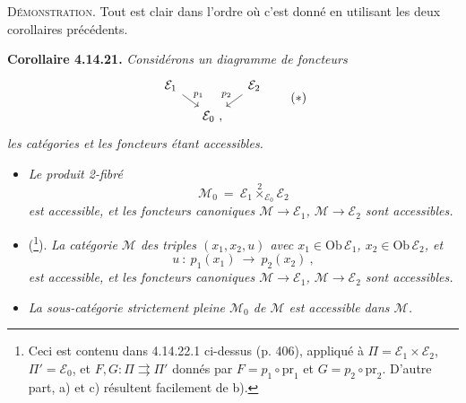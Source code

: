\documentclass[11pt]{article}
\newcommand{\msp}[1]{\marginpar{\footnotesize [#1]}}
\newcommand{\Ob}{\mathrm{Ob}\,}
\newcommand{\pr}{\mathrm{pr}}
\begin{document}
\textsc{Démonstration}. Tout est clair dans l’ordre où c’est donné en utilisant les deux corollaires précédents.

\textbf{Corollaire 4.14.21.} \textit{Considérons un diagramme de foncteurs}
\[
\begin{tikzcd}[column sep=small, row sep=small]
\mathcal{E}_1 \arrow[dr, "p_1"] & & \mathcal{E}_2 \arrow[dl, "p_2"'] \\
& \mathcal{E}_0 \ , &
\end{tikzcd}
\tag*{$(*)$}
\]
\textit{les catégories et les foncteurs étant accessibles.}

\msp{page 397}
\begin{itemize}[leftmargin=2.5em]
\item[\textit{a)}] \textit{Le produit 2-fibré}
\[
\mathcal{M}_0 \ = \ \mathcal{E}_1 \overset{2}{\times}_{\mathcal{E}_0} \mathcal{E}_2
\]
\textit{est accessible, et les foncteurs canoniques $\mathcal{M} \longrightarrow \mathcal{E}_1$, $\mathcal{M} \longrightarrow \mathcal{E}_2$ sont accessibles.} %
\item[\textit{b)}] (\footnote[169]{Ceci est contenu dans 4.14.22.1 ci-dessus (p. 406), appliqué à $\Pi = \mathcal{E}_1{\times}\mathcal{E}_2$, $\Pi' = \mathcal{E}_0$, et $F, G : \Pi \rightrightarrows \Pi'$ donnés par $F = p_1\circ\pr_1$ et $G = p_2\circ\pr_2$. D’autre part, a) et c) résultent facilement de b).}). \textit{La catégorie $\mathcal{M}$ des triples $(x_1,x_2,u)$ avec $x_1 \in \Ob\mathcal{E}_1$, $x_2 \in \Ob\mathcal{E}_2$, et}
\[
u \ : \ p_1(x_1) \ \longrightarrow \ p_2(x_2) \ ,
\]
\textit{est accessible, et les foncteurs canoniques $\mathcal{M} \longrightarrow \mathcal{E}_1$, $\mathcal{M} \longrightarrow \mathcal{E}_2$ sont accessibles.}
\item[\textit{c)}] \textit{La sous-catégorie strictement pleine $\mathcal{M}_0$ de $\mathcal{M}$ est accessible dans $\mathcal{M}$.}
\end{itemize}
\end{document}
